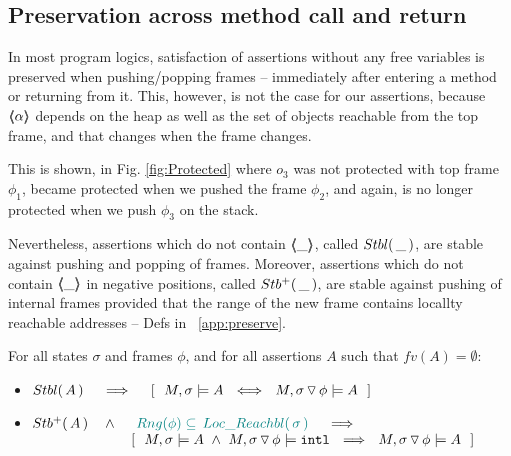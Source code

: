 \subsection{Preservation across method call and return}
In most program logics, satisfaction of assertions without any free variables  is preserved when pushing/popping frames
-- \ie immediately after entering a method or  returning from it.
This, however, is not   the case for our assertions, because  $\langle\!\!\langle \alpha \rangle\!\!\rangle$ depends on the heap as well as the set of objects reachable from the top frame, and  
that changes when the frame changes.
{This is shown, \eg in  Fig. \ref{fig:Protected} where $o_3$ was not protected with top frame $\phi_1$,  
became protected when we pushed the frame $\phi_2$,  and again, is no longer protected when we push $\phi_3$ on the stack. 

 

Nevertheless,  assertions which do  not contain  $\langle\!\!\langle \_ \rangle\!\!\rangle$, called   ${Stbl(\, \_\, )}$, are stable against pushing and popping of frames.  
Moreover, assertions which do  not contain $\langle\!\!\langle \_ \rangle\!\!\rangle$ in negative positions, called ${Stb^+(\, \_\, )}$,  are stable against pushing  of {internal} frames provided that the range of the new frame contains locallty reachable addresses -- 
\cf  Defs   in \A\ \ref{app:preserve}.

\begin{lemma}
For all  states $\sigma$ and frames $\phi$, and for all assertions $A$ such that $ fv(A)=\emptyset$:
\label{l:preserve:asrt}
 
\begin{itemize}
\item 
$\Stable{A}\ \ \ \  \Longrightarrow \ \  \ \  [\ \ M, \sigma \models A \ \ \Longleftrightarrow \ \  M,{\PushSLong \phi \sigma} \models A\ \ ]$
\item 
\label{l:preserve:asrt:two}
$\Pos{A}\ \ \  \wedge \ \ \  \sdN{   \ Rng(\phi)\subseteq \LRelevantO   \sigma \ } \ \ \ \Longrightarrow $
\\
$\strut \hspace{2cm} \ \  \ \  [\ \ M, \sigma \models A \  \wedge \  M, {\PushSLong \phi \sigma} \models  \intThis \ \ \Longrightarrow \ \  M,{\PushSLong \phi \sigma} \models A\ \ ]$
%
\end{itemize}
\end{lemma}

}
